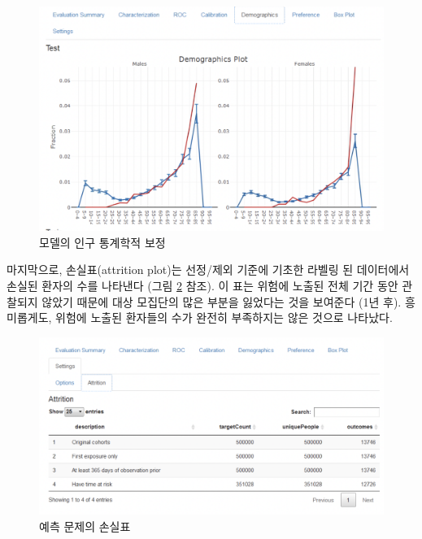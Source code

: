 \documentclass[11pt]{book}
\theoremstyle{definition}
\theoremstyle{definition}
\theoremstyle{definition}
\theoremstyle{remark}
\begin{document}
\begin{figure}

{\centering \includegraphics[width=1\linewidth]{images/PatientLevelPrediction/shiny/singleShiny/singleShinyDemo} 

}

\caption{모델의 인구 통계학적 보정}\label{fig:shinyDemo}
\end{figure}

마지막으로, 손실표(attrition plot)는 선정/제외 기준에 기초한 라벨링 된
데이터에서 손실된 환자의 수를 나타낸다 (그림 \ref{fig:shinyAtt} 참조).
이 표는 위험에 노출된 전체 기간 동안 관찰되지 않았기 때문에 대상
모집단의 많은 부분을 잃었다는 것을 보여준다 (1년 후). 흥미롭게도, 위험에
노출된 환자들의 수가 완전히 부족하지는 않은 것으로 나타났다.

\begin{figure}

{\centering \includegraphics[width=1\linewidth]{images/PatientLevelPrediction/shiny/singleShiny/singleShinyAtt} 

}

\caption{예측 문제의 손실표}\label{fig:shinyAtt}
\end{figure}
\end{document}
